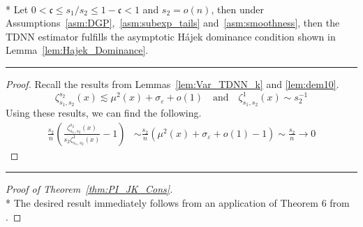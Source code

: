 \begin{lem}\label{lem:TDNN_Hajek_Dominance}\mbox{}\\*
	Let $0 < \mathfrak{c} \leq s_1/s_2 \leq 1 - \mathfrak{c} < 1$ and $s_2 = o(n)$, then under Assumptions~\ref{asm:DGP},~\ref{asm:subexp_tails} and~\ref{asm:smoothness}, then the TDNN estimator fulfills the asymptotic H\'ajek dominance condition shown in Lemma~\ref{lem:Hajek_Dominance}.
\end{lem}
\hrule
\begin{proof}
	Recall the results from Lemmas~\ref{lem:Var_TDNN_k} and \ref{lem:dem10}.
	\begin{equation*}
		\zeta_{s_1, s_2}^{s_2}\left(x\right) \lesssim \mu^2(x) + \sigma_{\varepsilon} + o(1)
		\quad \text{and} \quad
		\zeta_{s_1, s_2}^{1}\left(x\right) \sim s_2^{-1}
	\end{equation*}
	Using these results, we can find the following.
	\begin{equation}
		\begin{aligned}
			\frac{s_2}{n}\left(\frac{
				\zeta_{s_1, s_2}^{s_2}\left(x\right)}{s_2 \zeta_{s_1, s_2}^{1}\left(x\right)} - 1\right)
			 & \sim \frac{s_2}{n}\left(\mu^2(x) + \sigma_{\varepsilon} + o(1) - 1\right)
			\sim \frac{s_2}{n} \rightarrow 0
		\end{aligned}
	\end{equation}
\end{proof}
\hrule

\begin{proof}[Proof of Theorem~\ref{thm:PI_JK_Cons}]\mbox{}\\*
	The desired result immediately follows from an application of Theorem 6 from \citet{peng_bias_2021}.
\end{proof}

